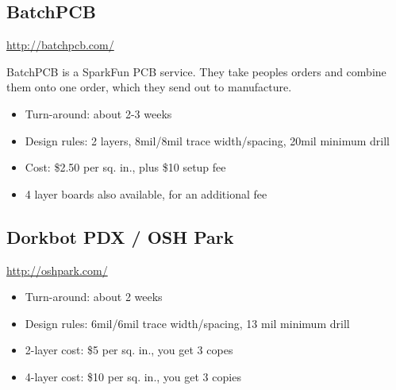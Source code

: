 \documentclass[letterpaper]{article}
\newcommand\liststyleRTFNumxvii{%
\renewcommand\labelitemi{{\textbullet}}
\renewcommand\labelitemii{o}
\renewcommand\labelitemiii{${\blacksquare}$}
\renewcommand\labelitemiv{{\textbullet}}
}
\newcommand\liststyleRTFNumiv{%
\renewcommand\labelitemi{{\textbullet}}
\renewcommand\labelitemii{o}
\renewcommand\labelitemiii{${\blacksquare}$}
\renewcommand\labelitemiv{{\textbullet}}
}
\begin{document}
\subsection{BatchPCB}
\hypertarget{Toc337742714}{}{\sffamily\color[rgb]{0.30980393,0.5058824,0.7411765}
\url{http://batchpcb.com/} }

{\sffamily\color[rgb]{0.30980393,0.5058824,0.7411765}
BatchPCB is a SparkFun PCB service. They take peoples orders and combine them onto one order, which they send out to
manufacture.}

\liststyleRTFNumxvii
\begin{itemize}
\item {\sffamily\color[rgb]{0.30980393,0.5058824,0.7411765}
Turn-around: about 2-3 weeks}
\item {\sffamily\color[rgb]{0.30980393,0.5058824,0.7411765}
Design rules: 2 layers, 8mil/8mil trace width/spacing, 20mil minimum drill}
\item {\sffamily\color[rgb]{0.30980393,0.5058824,0.7411765}
Cost: \$2.50 per sq. in., plus \$10 setup fee}
\item {\sffamily\color[rgb]{0.30980393,0.5058824,0.7411765}
4 layer boards also available, for an additional fee}
\end{itemize}
\subsection{Dorkbot PDX / OSH Park}
\hypertarget{Toc337742715}{}{\sffamily\color[rgb]{0.30980393,0.5058824,0.7411765}
\url{http://oshpark.com/} }

\liststyleRTFNumiv
\begin{itemize}
\item {\sffamily\color[rgb]{0.30980393,0.5058824,0.7411765}
Turn-around: about 2 weeks}
\item {\sffamily\color[rgb]{0.30980393,0.5058824,0.7411765}
Design rules: 6mil/6mil trace width/spacing, 13 mil minimum drill}
\item {\sffamily\color[rgb]{0.30980393,0.5058824,0.7411765}
2-layer cost: \$5 per sq. in., you get 3 copes}
\item {\sffamily\color[rgb]{0.30980393,0.5058824,0.7411765}
4-layer cost: \$10 per sq. in., you get 3 copies}
\end{itemize}
\end{document}
